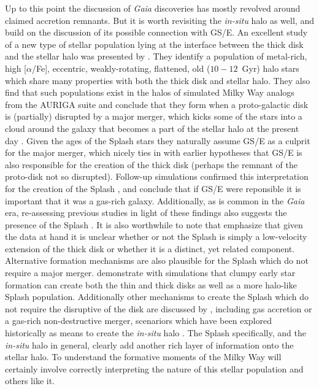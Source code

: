 Up to this point the discussion of \textit{Gaia} discoveries has mostly revolved around claimed accretion remnants. But it is worth revisiting the \textit{in-situ} halo as well, and build on the discussion of its possible connection with GS/E. An excellent study of a new type of stellar population lying at the interface between the thick disk and the stellar halo was presented by \textcite{belokurov20}. They identify a population of metal-rich, high [$\alpha$/Fe], eccentric, weakly-rotating, flattened, old ($10-12$~Gyr) halo stars which share many properties with both the thick disk and stellar halo. They also find that such populations exist in the halos of simulated Milky Way analogs from the AURIGA suite and conclude that they form when a proto-galactic disk is (partially) disrupted by a major merger, which kicks some of the stars into a cloud around the galaxy that becomes a part of the stellar halo at the present day \parencite[for a theoretical proposal of such a mechanism see][]{mccarthy12}. Given the ages of the Splash stars they naturally assume GS/E as a culprit for the major merger, which nicely ties in with earlier hypotheses that GS/E is also responsible for the creation of the thick disk (perhaps the remnant of the proto-disk not so disrupted). Follow-up simulations confirmed this interpretation for the creation of the Splash \parencite{grand20,renaud21}, and conclude that if GS/E were reponsible it is important that it was a gas-rich galaxy. Additionally, as is common in the \textit{Gaia} era, re-assessing previous studies in light of these findings also suggests the presence of the Splash \parencite[e.g.][]{bonaca17,dimatteo19,gallart19,amarante20a}. It is also worthwhile to note that \textcite{belokurov20} emphasize that given the data at hand it is unclear whether or not the Splash is simply a low-velocity extension of the thick disk or whether it is a distinct, yet related component. Alternative formation mechanisms are also plausible for the Splash which do not require a major merger. \textcite{amarante20b} demonstrate with simulations that clumpy early star formation can create both the thin and thick disks as well as a more halo-like Splash population. Additionally other mechanisms to create the Splash which do not require the disruptive of the disk are discussed by \textcite{belokurov20}, including gas accretion or a gas-rich non-destructive merger, scenariors which have been explored historically as means to create the \textit{in-situ} halo \parencite[see][]{cooper15}. The Splash specifically, and the \textit{in-situ} halo in general, clearly add another rich layer of information onto the stellar halo. To understand the formative moments of the Milky Way will certainly involve correctly interpreting the nature of this stellar population and others like it.

